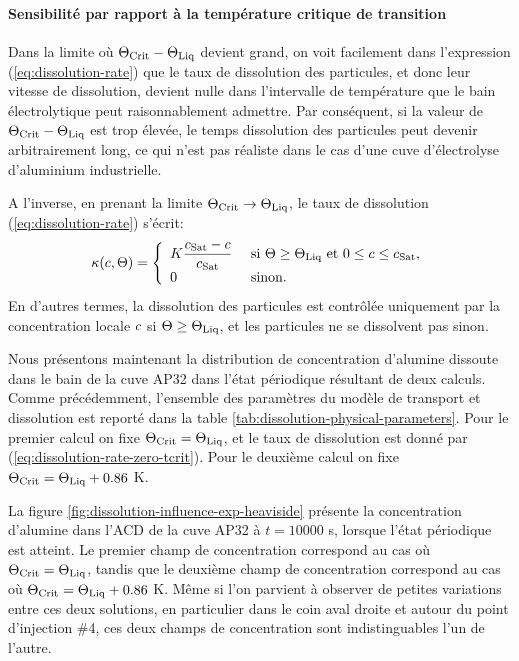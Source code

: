 \clearpage
\paragraph{Sensibilité par rapport à la température critique de transition}


Dans la limite où $\Theta_\text{Crit} - \Theta_\text{Liq}$ devient grand, on voit facilement
dans l'expression (\ref{eq:dissolution-rate}) que le taux de
dissolution des particules, et donc leur vitesse de dissolution,
devient nulle dans l'intervalle de température que le bain
électrolytique peut raisonnablement admettre. Par conséquent, si la
valeur de $\Theta_\text{Crit} - \Theta_\text{Liq}$ est trop élevée, le temps dissolution des
particules peut devenir arbitrairement long, ce qui n'est pas réaliste
dans le cas d'une cuve d'électrolyse d'aluminium industrielle.

A l'inverse, en prenant la limite $\Theta_\text{Crit} \to  \Theta_\text{Liq}$, le taux de
dissolution (\ref{eq:dissolution-rate}) s'écrit:
\begin{equation}\label{eq:dissolution-rate-zero-tcrit}
  \kappa(c,\Theta) = \left\{
  \begin{array}{ll}
  K \displaystyle\frac{c_\text{Sat} - c}{c_\text{Sat}}& \text{ si } \Theta
  \geq \Theta_\text{Liq}\text{ et } 0\leq c \leq c_\text{Sat},\\
  0 &  \text{ sinon.}
  \end{array}
  \right.
\end{equation}
En d'autres termes, la dissolution des particules est contrôlée
uniquement par la concentration locale $c$ si
$\Theta \geq \Theta_\text{Liq}$, et les particules ne se dissolvent pas sinon.

Nous présentons maintenant la distribution de concentration d'alumine
dissoute dans le bain de la cuve AP32 dans l'état périodique résultant
de deux calculs. Comme précédemment, l'ensemble des paramètres du
modèle de transport et dissolution est reporté dans la table
\ref{tab:dissolution-physical-parameters}. Pour le premier calcul on
fixe $\Theta_\text{Crit} = \Theta_\text{Liq}$, et le taux de dissolution est donné par
(\ref{eq:dissolution-rate-zero-tcrit}). Pour le deuxième calcul on
fixe $\Theta_\text{Crit} = \Theta_\text{Liq} + 0.86$ \si{\kelvin}.

La figure \ref{fig:dissolution-influence-exp-heaviside} présente la
concentration d'alumine dans l'ACD de la cuve AP32 à $t = \num{10000}$
\si{\second}, lorsque l'état périodique est atteint. Le premier champ
de concentration correspond au cas où $\Theta_\text{Crit} = \Theta_\text{Liq}$, tandis que le
deuxième champ de concentration correspond au cas où $\Theta_\text{Crit} = \Theta_\text{Liq} +
0.86$ \si{\kelvin}. Même si l'on parvient à observer de petites
variations entre ces deux solutions, en particulier dans le coin aval
droite et autour du point d'injection \#4, ces deux champs de
concentration sont indistinguables l'un de l'autre.


